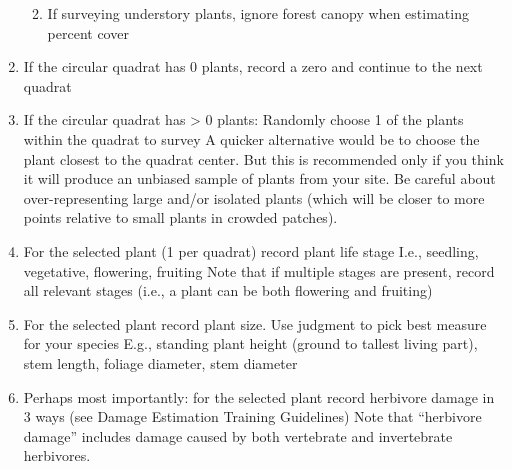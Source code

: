 \documentclass[
  letterpaper,
  DIV=11,
  numbers=noendperiod]{scrreprt}
\providecommand{\tightlist}{%
  \setlength{\itemsep}{0pt}\setlength{\parskip}{0pt}}\usepackage{longtable,booktabs,array}
\begin{document}
\begin{enumerate}
  \begin{enumerate}
  \def\labelenumii{\roman{enumii}.}
  \setcounter{enumii}{1}
  \tightlist
  \item
    If surveying understory plants, ignore forest canopy when estimating
    percent cover
  \end{enumerate}
\item
  If the circular quadrat has 0 plants, record a zero and continue to
  the next quadrat
\item
  If the circular quadrat has \textgreater{} 0 plants: Randomly choose 1
  of the plants within the quadrat to survey A quicker alternative would
  be to choose the plant closest to the quadrat center. But this is
  recommended only if you think it will produce an unbiased sample of
  plants from your site. Be careful about over-representing large and/or
  isolated plants (which will be closer to more points relative to small
  plants in crowded patches).
\item
  For the selected plant (1 per quadrat) record plant life stage I.e.,
  seedling, vegetative, flowering, fruiting Note that if multiple stages
  are present, record all relevant stages (i.e., a plant can be both
  flowering and fruiting)
\item
  For the selected plant record plant size. Use judgment to pick best
  measure for your species E.g., standing plant height (ground to
  tallest living part), stem length, foliage diameter, stem diameter
\item
  Perhaps most importantly: for the selected plant record herbivore
  damage in 3 ways (see Damage Estimation Training Guidelines) Note that
  ``herbivore damage'' includes damage caused by both vertebrate and
  invertebrate herbivores.
\end{enumerate}
\end{document}
